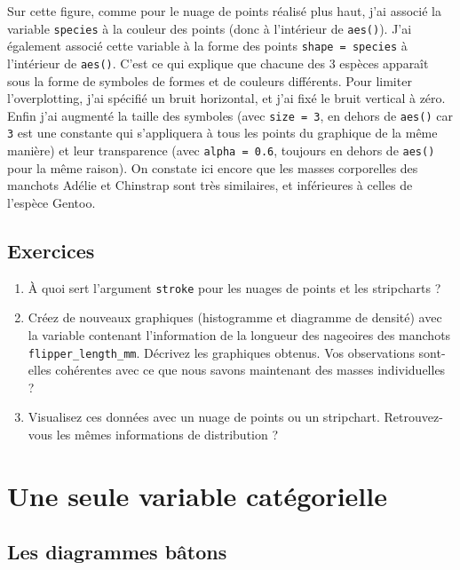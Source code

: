 \documentclass[
  letterpaper,
  DIV=11,
  numbers=noendperiod]{scrreprt}
\begin{document}
Sur cette figure, comme pour le nuage de points réalisé plus haut, j'ai
associé la variable \texttt{species} à la couleur des points (donc à
l'intérieur de \texttt{aes()}). J'ai également associé cette variable à
la forme des points \texttt{shape\ =\ species} à l'intérieur de
\texttt{aes()}. C'est ce qui explique que chacune des 3 espèces apparaît
sous la forme de symboles de formes et de couleurs différents. Pour
limiter l'overplotting, j'ai spécifié un bruit horizontal, et j'ai fixé
le bruit vertical à zéro. Enfin j'ai augmenté la taille des symboles
(avec \texttt{size\ =\ 3}, en dehors de \texttt{aes()} car \texttt{3}
est une constante qui s'appliquera à tous les points du graphique de la
même manière) et leur transparence (avec \texttt{alpha\ =\ 0.6},
toujours en dehors de \texttt{aes()} pour la même raison). On constate
ici encore que les masses corporelles des manchots Adélie et Chinstrap
sont très similaires, et inférieures à celles de l'espèce Gentoo.

\hypertarget{sec-Exo-4}{%
\subsection{Exercices}\label{sec-Exo-4}}

\begin{enumerate}
\def\labelenumi{\arabic{enumi}.}
\item
  À quoi sert l'argument \texttt{stroke} pour les nuages de points et
  les stripcharts ?
\item
  Créez de nouveaux graphiques (histogramme et diagramme de densité)
  avec la variable contenant l'information de la longueur des nageoires
  des manchots \texttt{flipper\_length\_mm}. Décrivez les graphiques
  obtenus. Vos observations sont-elles cohérentes avec ce que nous
  savons maintenant des masses individuelles ?
\item
  Visualisez ces données avec un nuage de points ou un stripchart.
  Retrouvez-vous les mêmes informations de distribution ?
\end{enumerate}

\hypertarget{une-seule-variable-catuxe9gorielle}{%
\section{Une seule variable
catégorielle}\label{une-seule-variable-catuxe9gorielle}}

\hypertarget{les-diagrammes-buxe2tons}{%
\subsection{Les diagrammes bâtons}\label{les-diagrammes-buxe2tons}}
\end{document}
